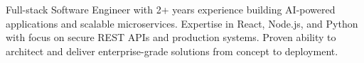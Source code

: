 \documentclass[12pt, letterpaper]{russell}
\begin{document}
\makecvheader

\vspace{-.6cm}

\vspace{-0.05cm}
\begin{cvsummary}
Full-stack Software Engineer with 2+ years experience building AI-powered applications and scalable microservices. Expertise in React, Node.js, and Python with focus on secure REST APIs and production systems. Proven ability to architect and deliver enterprise-grade solutions from concept to deployment.
\end{cvsummary}

\vspace{-0.05cm}
\end{document}
